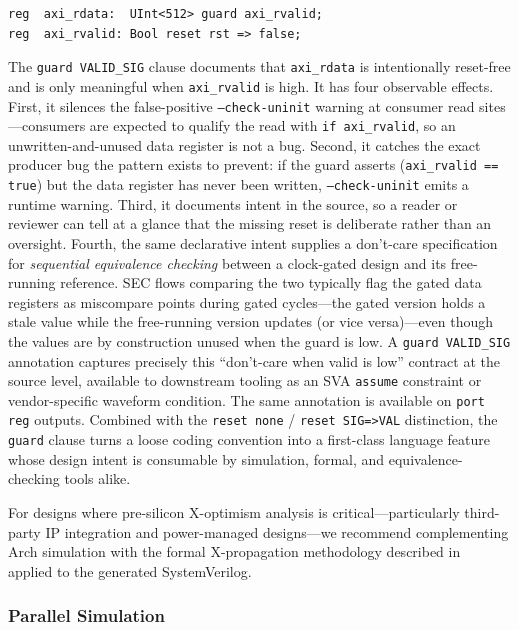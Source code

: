 \documentclass[manuscript]{acmart}
\begin{document}
\begin{lstlisting}[language=Arch]
reg  axi_rdata:  UInt<512> guard axi_rvalid;
reg  axi_rvalid: Bool reset rst => false;
\end{lstlisting}

The \texttt{guard VALID\_SIG} clause documents that \texttt{axi\_rdata} is intentionally reset-free and is only meaningful when \texttt{axi\_rvalid} is high. It has four observable effects. First, it silences the false-positive \texttt{--check-uninit} warning at consumer read sites---consumers are expected to qualify the read with \texttt{if axi\_rvalid}, so an unwritten-and-unused data register is not a bug. Second, it catches the exact producer bug the pattern exists to prevent: if the guard asserts (\texttt{axi\_rvalid == true}) but the data register has never been written, \texttt{--check-uninit} emits a runtime warning. Third, it documents intent in the source, so a reader or reviewer can tell at a glance that the missing reset is deliberate rather than an oversight. Fourth, the same declarative intent supplies a don't-care specification for \emph{sequential equivalence checking} between a clock-gated design and its free-running reference. SEC flows comparing the two typically flag the gated data registers as miscompare points during gated cycles---the gated version holds a stale value while the free-running version updates (or vice versa)---even though the values are by construction unused when the guard is low. A \texttt{guard VALID\_SIG} annotation captures precisely this ``don't-care when valid is low'' contract at the source level, available to downstream tooling as an SVA \texttt{assume} constraint or vendor-specific waveform condition. The same annotation is available on \texttt{port reg} outputs. Combined with the \texttt{reset none} / \texttt{reset SIG=>VAL} distinction, the \texttt{guard} clause turns a loose coding convention into a first-class language feature whose design intent is consumable by simulation, formal, and equivalence-checking tools alike.

For designs where pre-silicon X-optimism analysis is critical---particularly third-party IP integration and power-managed designs---we recommend complementing Arch simulation with the formal X-propagation methodology described in~\cite{zhao2014xoptimism} applied to the generated SystemVerilog.

\subsubsection{Parallel Simulation}
\end{document}
